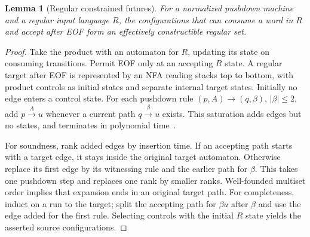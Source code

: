 \documentclass[manuscript,screen,11pt,nonacm]{acmart}
\newtheorem{lemma}[theorem]{Lemma}
\theoremstyle{definition}\newtheorem{definition}{Definition}
\begin{document}
\begin{lemma}[Regular constrained futures]\label{lem:regular}
For a normalized pushdown machine and a regular input language $R$, the configurations that can consume a word in $R$ and accept after EOF form an effectively constructible regular set.
\end{lemma}
\begin{proof}
Take the product with an automaton for $R$, updating its state on consuming transitions. Permit EOF only at an accepting $R$ state. A regular target after EOF is represented by an NFA reading stacks top to bottom, with product controls as initial states and separate internal target states. Initially no edge enters a control state. For each pushdown rule $(p,A)\longrightarrow(q,\beta)$, $|\beta|\le2$, add $p\xrightarrow A u$ whenever a current path $q\xrightarrow\beta u$ exists. This saturation adds edges but no states, and terminates in polynomial time~\cite{10.1007/3-540-63141-0_10}.

For soundness, rank added edges by insertion time. If an accepting path starts with a target edge, it stays inside the original target automaton. Otherwise replace its first edge by its witnessing rule and the earlier path for $\beta$. This takes one pushdown step and replaces one rank by smaller ranks. Well-founded multiset order implies that expansion ends in an original target path. For completeness, induct on a run to the target; split the accepting path for $\beta u$ after $\beta$ and use the edge added for the first rule. Selecting controls with the initial $R$ state yields the asserted source configurations.
\end{proof}
\end{document}
